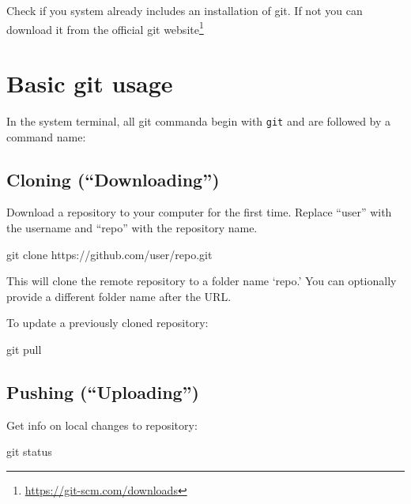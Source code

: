 \documentclass[
]{book}
\newenvironment{Shaded}{\begin{snugshade}}{\end{snugshade}}
\newcommand{\FunctionTok}[1]{\textcolor[rgb]{0.00,0.00,0.00}{#1}}
\newcommand{\NormalTok}[1]{#1}
\DeclareRobustCommand{\href}[2]{#2\footnote{\url{#1}}}
\begin{document}
Check if you system already includes an installation of git. If not you can download it from the official \href{https://git-scm.com/downloads}{git website}

\hypertarget{basic-git-usage}{%
\section{Basic git usage}\label{basic-git-usage}}

In the system terminal, all git commanda begin with \texttt{git} and are followed by a command name:

\hypertarget{cloning-downloading}{%
\subsection{Cloning (``Downloading'')}\label{cloning-downloading}}

Download a repository to your computer for the first time. Replace ``user'' with the username and ``repo'' with the repository name.

\begin{Shaded}
\begin{Highlighting}[]
\FunctionTok{git}\NormalTok{ clone https://github.com/user/repo.git}
\end{Highlighting}
\end{Shaded}

This will clone the remote repository to a folder name `repo.' You can optionally provide a different folder name after the URL.

To update a previously cloned repository:

\begin{Shaded}
\begin{Highlighting}[]
\FunctionTok{git}\NormalTok{ pull}
\end{Highlighting}
\end{Shaded}

\hypertarget{pushing-uploading}{%
\subsection{Pushing (``Uploading'')}\label{pushing-uploading}}

Get info on local changes to repository:

\begin{Shaded}
\begin{Highlighting}[]
\FunctionTok{git}\NormalTok{ status}
\end{Highlighting}
\end{Shaded}
\end{document}
